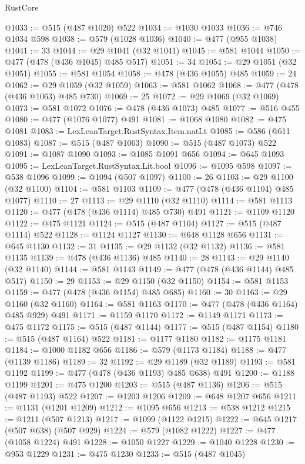 \begin{lexlean}{RustCore}
\begin{coremodule}
@1033 := @515 (@487 @1020) @522
@1034 := @1030 @1033
@1036 := @746 @1034 @598
@1038 := @579 (@1028 @1036)
@1040 := @477 (@955 @1038)
@1041 := 33
@1044 := @29 @1041 (@32 @1041)
@1045 := @581 @1044
@1050 := @477 (@478 (@436 @1045) @485 @517)
@1051 := 34
@1054 := @29 @1051 (@32 @1051)
@1055 := @581 @1054
@1058 := @478 (@436 @1055) @485
@1059 := 24
@1062 := @29 @1059 (@32 @1059)
@1063 := @581 @1062
@1068 := @477 (@478 (@436 @1063) @485 @730)
@1069 := 25
@1072 := @29 @1069 (@32 @1069)
@1073 := @581 @1072
@1076 := @478 (@436 @1073) @485
@1077 := @516 @455
@1080 := @477 (@1076 @1077) @491
@1081 := @1068 @1080
@1082 := @475 @1081
@1083 := LexLeanTarget.RustSyntax.Item.natLt
@1085 := @586 (@611 @1083)
@1087 := @515 (@487 @1063)
@1090 := @515 (@487 @1073) @522
@1091 := @1087 @1090
@1093 := @1085 @1091 @656
@1094 := @645 @1093
@1095 := LexLeanTarget.RustSyntax.Lit.bool
@1096 := @1095 @598
@1097 := @538 @1096
@1099 := @1094 (@507 @1097)
@1100 := 26
@1103 := @29 @1100 (@32 @1100)
@1104 := @581 @1103
@1109 := @477 (@478 (@436 @1104) @485 @1077)
@1110 := 27
@1113 := @29 @1110 (@32 @1110)
@1114 := @581 @1113
@1120 := @477 (@478 (@436 @1114) @485 @730) @491
@1121 := @1109 @1120
@1122 := @475 @1121
@1124 := @515 (@487 @1104)
@1127 := @515 (@487 @1114) @522
@1128 := @1124 @1127
@1130 := @648 @1128 @656
@1131 := @645 @1130
@1132 := 31
@1135 := @29 @1132 (@32 @1132)
@1136 := @581 @1135
@1139 := @478 (@436 @1136) @485
@1140 := 28
@1143 := @29 @1140 (@32 @1140)
@1144 := @581 @1143
@1149 := @477 (@478 (@436 @1144) @485 @517)
@1150 := 29
@1153 := @29 @1150 (@32 @1150)
@1154 := @581 @1153
@1159 := @477 (@478 (@436 @1154) @485 @685)
@1160 := 30
@1163 := @29 @1160 (@32 @1160)
@1164 := @581 @1163
@1170 := @477 (@478 (@436 @1164) @485 @929) @491
@1171 := @1159 @1170
@1172 := @1149 @1171
@1173 := @475 @1172
@1175 := @515 (@487 @1144)
@1177 := @515 (@487 @1154)
@1180 := @515 (@487 @1164) @522
@1181 := @1177 @1180
@1182 := @1175 @1181
@1184 := @1000 @1182 @656
@1186 := @579 (@1173 @1184)
@1188 := @477 (@1139 @1186)
@1189 := 32
@1192 := @29 @1189 (@32 @1189)
@1193 := @581 @1192
@1199 := @477 (@478 (@436 @1193) @485 @638) @491
@1200 := @1188 @1199
@1201 := @475 @1200
@1203 := @515 (@487 @1136)
@1206 := @515 (@487 @1193) @522
@1207 := @1203 @1206
@1209 := @648 @1207 @656
@1211 := @1131 (@1201 @1209)
@1212 := @1095 @656
@1213 := @538 @1212
@1215 := @1211 (@507 @1213)
@1217 := @1099 (@1122 @1215)
@1222 := @645 @1217 (@507 @638) (@507 @929)
@1224 := @579 (@1082 @1222)
@1227 := @477 (@1058 @1224) @491
@1228 := @1050 @1227
@1229 := @1040 @1228
@1230 := @953 @1229
@1231 := @475 @1230
@1233 := @515 (@487 @1045)

\end{coremodule}
\end{lexlean}
